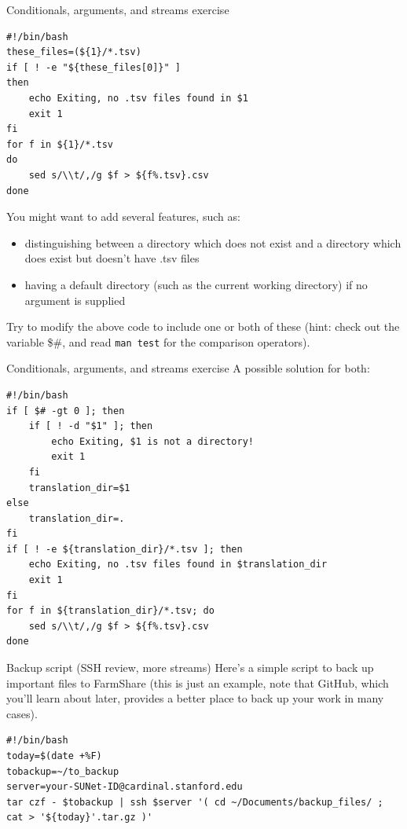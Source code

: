 \documentclass{beamer}
\begin{document}
\begin{frame}[fragile]{Conditionals, arguments, and streams exercise}
\begin{lstlisting}[basicstyle=\small]
#!/bin/bash
these_files=(${1}/*.tsv)
if [ ! -e "${these_files[0]}" ]
then
    echo Exiting, no .tsv files found in $1
    exit 1
fi 
for f in ${1}/*.tsv
do
    sed s/\\t/,/g $f > ${f%.tsv}.csv
done
\end{lstlisting}
You might want to add several features, such as: 
\begin{itemize}
\item distinguishing between a directory which does not exist and a directory which does exist but doesn't have .tsv files
\item having a default directory (such as the current working directory) if no argument is supplied
\end{itemize}
Try to modify the above code to include one or both of these (hint: check out the variable \$\#, and read \lstinline|man test| for the comparison operators). 
\end{frame}

\begin{frame}[fragile]{Conditionals, arguments, and streams exercise}
A possible solution for both:
\begin{lstlisting}[basicstyle=\small]
#!/bin/bash
if [ $# -gt 0 ]; then
    if [ ! -d "$1" ]; then
        echo Exiting, $1 is not a directory!
        exit 1
    fi
    translation_dir=$1
else
    translation_dir=.
fi
if [ ! -e ${translation_dir}/*.tsv ]; then
    echo Exiting, no .tsv files found in $translation_dir
    exit 1
fi 
for f in ${translation_dir}/*.tsv; do
    sed s/\\t/,/g $f > ${f%.tsv}.csv
done
\end{lstlisting}
\end{frame}

\begin{frame}[fragile]{Backup script (SSH review, more streams)}
Here's a simple script to back up important files to FarmShare (this is just an example, note that GitHub, which you'll learn about later, provides a better place to back up your work in many cases). 
\begin{lstlisting}[title=backup.sh]
#!/bin/bash
today=$(date +%F)
tobackup=~/to_backup
server=your-SUNet-ID@cardinal.stanford.edu
tar czf - $tobackup | ssh $server '( cd ~/Documents/backup_files/ ; cat > '${today}'.tar.gz )'
\end{lstlisting}
\end{frame}
\end{document}
